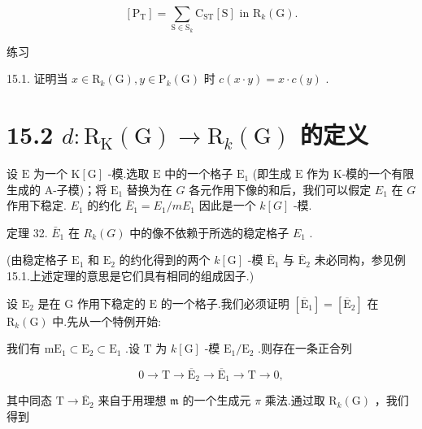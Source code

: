 \documentclass[10pt]{article}
\begin{document}
\[
\left\lbrack  {\mathrm{P}}_{\mathrm{T}}\right\rbrack   = \mathop{\sum }\limits_{{\mathrm{S} \in  {\mathrm{S}}_{k}}}{\mathrm{C}}_{\mathrm{{ST}}}\left\lbrack  \mathrm{S}\right\rbrack  \text{ in }{\mathrm{R}}_{k}\left( \mathrm{G}\right) .
\]

练习

15.1. 证明当 \(x \in  {\mathrm{R}}_{k}\left( \mathrm{G}\right) ,y \in  {\mathrm{P}}_{k}\left( \mathrm{G}\right)\) 时 \(c\left( {x \cdot  y}\right)  = x \cdot  c\left( y\right)\) .

\section*{15.2 \(d : {\mathrm{R}}_{\mathrm{K}}\left( \mathrm{G}\right)  \rightarrow  {\mathrm{R}}_{k}\left( \mathrm{G}\right)\) 的定义}

设 \(\mathrm{E}\) 为一个 \(\mathrm{K}\left\lbrack  \mathrm{G}\right\rbrack\) -模.选取 \(\mathrm{E}\) 中的一个格子 \({\mathrm{E}}_{1}\) (即生成 \(\mathrm{E}\) 作为 K-模的一个有限生成的 A-子模)；将 \({\mathrm{E}}_{1}\) 替换为在 \(G\) 各元作用下像的和后，我们可以假定 \({E}_{1}\) 在 \(G\) 作用下稳定. \({E}_{1}\) 的约化 \({\bar{E}}_{1} = {E}_{1}/m{E}_{1}\) 因此是一个 \(k\left\lbrack  G\right\rbrack\) -模.

定理 32. \({\bar{E}}_{1}\) 在 \({R}_{k}\left( G\right)\) 中的像不依赖于所选的稳定格子 \({E}_{1}\) .

(由稳定格子 \({\mathrm{E}}_{1}\) 和 \({\mathrm{E}}_{2}\) 的约化得到的两个 \(k\left\lbrack  \mathrm{G}\right\rbrack\) -模 \({\overline{\mathrm{E}}}_{1}\) 与 \({\overline{\mathrm{E}}}_{2}\) 未必同构，参见例 15.1.上述定理的意思是它们具有相同的组成因子.)

设 \({\mathrm{E}}_{2}\) 是在 \(\mathrm{G}\) 作用下稳定的 \(\mathrm{E}\) 的一个格子.我们必须证明 \(\left\lbrack  {\overline{\mathrm{E}}}_{1}\right\rbrack   = \left\lbrack  {\overline{\mathrm{E}}}_{2}\right\rbrack\) 在 \({\mathrm{R}}_{k}\left( \mathrm{G}\right)\) 中.先从一个特例开始:

我们有 \({\mathrm{{mE}}}_{1} \subset  {\mathrm{E}}_{2} \subset  {\mathrm{E}}_{1}\) .设 \(\mathrm{T}\) 为 \(k\left\lbrack  \mathrm{G}\right\rbrack\) -模 \({\mathrm{E}}_{1}/{\mathrm{E}}_{2}\) .则存在一条正合列

\[
0 \rightarrow  \mathrm{T} \rightarrow  {\overline{\mathrm{E}}}_{2} \rightarrow  {\overline{\mathrm{E}}}_{1} \rightarrow  \mathrm{T} \rightarrow  0,
\]

其中同态 \(\mathrm{T} \rightarrow  {\overline{\mathrm{E}}}_{2}\) 来自于用理想 \(\mathfrak{m}\) 的一个生成元 \(\pi\) 乘法.通过取 \({\mathrm{R}}_{k}\left( \mathrm{G}\right)\) ，我们得到
\end{document}
